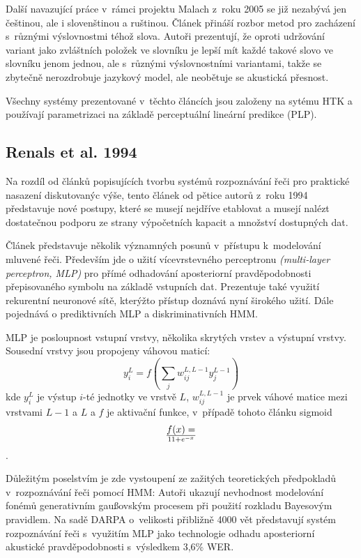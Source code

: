 Další navazující práce v~rámci projektu Malach\cite{psutka2005automatic} z~roku
2005 se již nezabývá jen češtinou, ale i slovenštinou a ruštinou. Článek
přináší rozbor metod pro zacházení s~různými výslovnostmi téhož slova. Autoři
prezentují, že oproti udržování variant jako zvláštních položek ve slovníku je
lepší mít každé takové slovo ve slovníku jenom jednou, ale s~různými
výslovnostními variantami, takže se zbytečně nerozdrobuje jazykový model, ale
neobětuje se akustická přesnost.

Všechny systémy prezentované v~těchto článcích jsou založeny na sytému HTK a
používají parametrizaci na základě perceptuální lineární predikce (PLP).

\subsection{Renals et al. 1994}

Na rozdíl od článků popisujících tvorbu systémů rozpoznávání řeči pro praktické
nasazení diskutovanýc výše, tento článek od pětice autorů z~roku
1994\cite{renals1994connectionist} představuje nové postupy, které se musejí
nejdříve etablovat a musejí nalézt dostatečnou podporu ze strany výpočetních
kapacit a množství dostupných dat.

Článek představuje několik významných posunů v~přístupu k~modelování mluvené
řeči. Především jde o užití vícevrstevného perceptronu \textit{(multi-layer
perceptron, MLP)} pro přímé odhadování aposteriorní pravděpodobnosti
přepisovaného symbolu na základě vstupních dat. Prezentuje také využití
rekurentní neuronové sítě, kterýžto přístup doznává nyní širokého užití. Dále
pojednává o prediktivních MLP a diskriminativních HMM.

MLP je posloupnost vstupní vrstvy, několika skrytých vrstev a výstupní vrstvy.
Sousední vrstvy jsou propojeny váhovou maticí:
\begin{equation}
y_i^L = f(\sum_j w_{ij}^{L,L-1}y_j^{L-1})
\end{equation}
kde $y_i^L$ je výstup $i$-té jednotky ve vrstvě $L$,
$w_{ij}^{L,L-1}$ je prvek váhové matice mezi vrstvami $L - 1$ a $L$
a $f$ je aktivační funkce, v~případě tohoto článku sigmoid
\begin{equation}
f(x) = \over{1}{1 + e^{-x}}
\end{equation}.

Důležitým poselstvím je zde vystoupení ze zažitých teoretických předpokladů
v~rozpoznávání řeči pomocí HMM: Autoři ukazují nevhodnost modelování fonémů
generativním gaußovským procesem při použití rozkladu Bayesovým pravidlem.
Na sadě DARPA o~velikosti přibližně 4000 vět představují systém rozpoznávání
řeči s~využitím MLP jako technologie odhadu aposteriorní akustické
pravděpodobnosti s~výsledkem 3,6\% WER.

